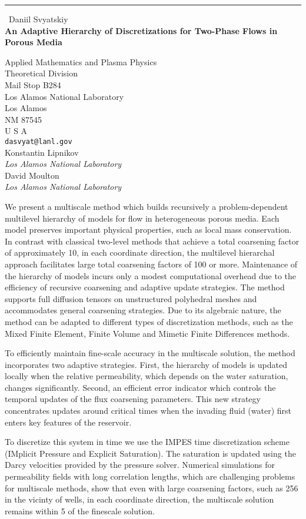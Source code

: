 \documentclass{report}
\begin{document}
\begin{center}
\rule{6in}{1pt} \
{\large Daniil Svyatskiy \\
{\bf An Adaptive Hierarchy of Discretizations for Two-Phase Flows in Porous Media}}

Applied Mathematics and Plasma Physics \\ Theoretical Division \\ Mail Stop B284 \\ Los Alamos National Laboratory \\ Los Alamos \\ NM 87545 \\ U S A
\\
{\tt dasvyat@lanl.gov}\\
Konstantin Lipnikov\\
{\em Los Alamos National Laboratory}\\
David Moulton\\
{\em Los Alamos National Laboratory}\end{center}

We present a multiscale method which builds recursively a
problem-dependent multilevel hierarchy of models for flow in
heterogeneous porous media. Each model preserves important physical
properties, such as local mass conservation. In contrast with classical
two-level methods that achieve a total coarsening factor of approximately
10, in each coordinate direction, the multilevel hierarchal approach
facilitates large total coarsening factors of 100 or more.
Maintenance of the hierarchy of models incurs only a modest
computational overhead due to the efficiency of recursive
coarsening and adaptive update strategies. The method supports full
diffusion tensors on unstructured polyhedral meshes and accommodates
general coarsening strategies. Due to its algebraic nature, the method
can be adapted to different types of discretization methods, such as the
Mixed Finite
Element, Finite Volume and Mimetic Finite Differences methods.


To efficiently maintain fine-scale accuracy in the multiscale
solution, the method incorporates two adaptive
strategies. First, the hierarchy of models is updated locally when
the relative permeability, which depends on the water saturation,
changes significantly. Second, an efficient error indicator which
controls the temporal updates of the flux coarsening parameters. This new
strategy concentrates updates around critical times when the invading
fluid (water) first enters key features of the reservoir.

To discretize this system in time we use the IMPES time discretization
scheme (IMplicit Pressure and Explicit Saturation). The saturation is
updated using the Darcy velocities provided by the pressure solver.
Numerical simulations for permeability fields with long correlation
lengths, which are challenging problems for multiscale methods, show that
even with large coarsening factors, such as 256 in the vicinty of wells,
in each coordinate direction, the multiscale solution remains within 5%
of the finescale solution.
\end{document}
